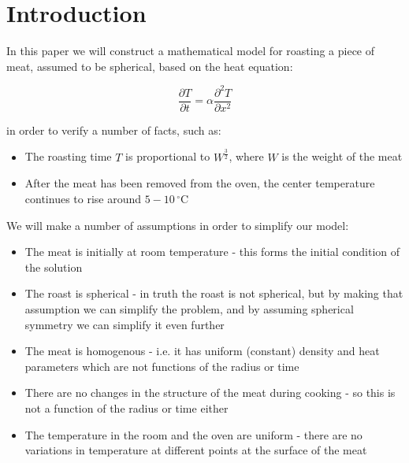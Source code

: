 \documentclass{report}
\begin{document}
\chapter{Introduction}

In this paper we will construct a mathematical model for roasting a piece of meat, 
assumed to be spherical, based on the heat equation:\bigskip

\[ \frac{\partial T}{\partial t} = \alpha \frac{\partial^2 T}{\partial x^2} \]\medskip

in order to verify a number of facts, such as:\bigskip

\begin{itemize}

\item The roasting time $T$ is proportional to $W^{\frac{3}{2}}$, where $W$ is 
      the weight of the meat
\item After the meat has been removed from the oven, the center temperature 
      continues to rise around $5 - 10\,^{\circ}\mathrm{C}$

\end{itemize}\medskip


We will make a number of assumptions in order to simplify our model:\bigskip

\begin{itemize}

\item The meat is initially at room temperature - this forms the initial condition 
      of the solution

\item The roast is spherical - in truth the roast is not spherical, but by making 
      that assumption we can simplify the problem, and by assuming spherical 
      symmetry we can simplify it even further

\item The meat is homogenous - i.e. it has uniform (constant) density and heat 
      parameters which are not functions of the radius or time

\item There are no changes in the structure of the meat during cooking - so this is 
      not a function of the radius or time either 

\item The temperature in the room and the oven are uniform - there are no variations 
      in temperature at different points at the surface of the meat

\end{itemize}
\end{document}
